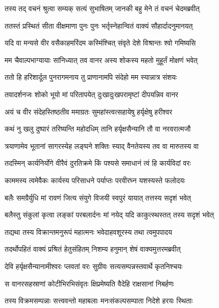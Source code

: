 \twolineshloka
{तस्य तद् वचनं श्रुत्वा सम्यक् सत्यं सुभाषितम्}
{जानकी बहु मेने तं वचनं चेदमब्रवीत्} %

\twolineshloka
{ततस्तं प्रस्थितं सीता वीक्षमाणा पुनः पुनः}
{भर्तृस्नेहान्वितं वाक्यं सौहार्दादनुमानयत्} %

\twolineshloka
{यदि वा मन्यसे वीर वसैकाहमरिंदम}
{कस्मिंश्चित् संवृते देशे विश्रान्तः श्वो गमिष्यसि} %

\twolineshloka
{मम चैवाल्पभाग्यायाः सांनिध्यात् तव वानर}
{अस्य शोकस्य महतो मुहूर्तं मोक्षणं भवेत्} %

\twolineshloka
{ततो हि हरिशार्दूल पुनरागमनाय तु}
{प्राणानामपि संदेहो मम स्यान्नात्र संशयः} %

\twolineshloka
{तवादर्शनजः शोको भूयो मां परितापयेत्}
{दुःखादुःखपरामृष्टां दीपयन्निव वानर} %

\twolineshloka
{अयं च वीर संदेहस्तिष्ठतीव ममाग्रतः}
{सुमहांस्त्वत्सहायेषु हर्यृक्षेषु हरीश्वर} %

\twolineshloka
{कथं नु खलु दुष्पारं तरिष्यन्ति महोदधिम्}
{तानि हर्यृक्षसैन्यानि तौ वा नरवरात्मजौ} %

\twolineshloka
{त्रयाणामेव भूतानां सागरस्येह लङ्घने}
{शक्तिः स्याद् वैनतेयस्य तव वा मारुतस्य वा} %

\twolineshloka
{तदस्मिन् कार्यनिर्योगे वीरैवं दुरतिक्रमे}
{किं पश्यसे समाधानं त्वं हि कार्यविदां वरः} %

\twolineshloka
{काममस्य त्वमेवैकः कार्यस्य परिसाधने}
{पर्याप्तः परवीरघ्न यशस्यस्ते फलोदयः} %

\twolineshloka
{बलैः समग्रैर्युधि मां रावणं जित्य संयुगे}
{विजयी स्वपुरं यायात् तत्तस्य सदृशं भवेत्} %

\twolineshloka
{बलैस्तु संकुलां कृत्वा लङ्कां परबलार्दनः}
{मां नयेद् यदि काकुत्स्थस्तत् तस्य सदृशं भवेत्} %

\twolineshloka
{तद्यथा तस्य विक्रान्तमनुरूपं महात्मनः}
{भवेदाहवशूरस्य तथा त्वमुपपादय} %

\twolineshloka
{तदर्थोपहितं वाक्यं प्रश्रितं हेतुसंहितम्}
{निशम्य हनुमान् शेषं वाक्यमुत्तरमब्रवीत्} %

\twolineshloka
{देवि हर्यृक्षसैन्यानामीश्वरः प्लवतां वरः}
{सुग्रीवः सत्यसम्पन्नस्तवार्थे कृतनिश्चयः} %

\twolineshloka
{स वानरसहस्राणां कोटीभिरभिसंवृतः}
{क्षिप्रमेष्यति वैदेहि राक्षसानां निबर्हणः} %

\twolineshloka
{तस्य विक्रमसम्पन्नाः सत्त्ववन्तो महाबलाः}
{मनःसंकल्पसम्पाता निदेशे हरयः स्थिताः} %

